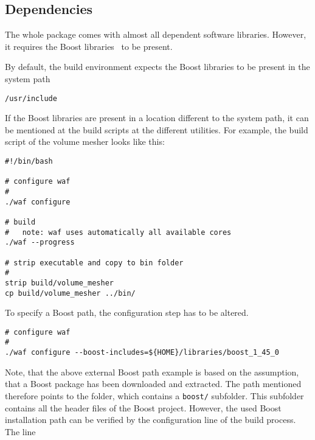 \subsection{Dependencies}
The whole package comes with almost all dependent software libraries.
However, it requires the Boost libraries~\cite{boost} to be present.


By default, the build environment expects the Boost libraries to be present 
in the system path
\begin{exaipd}
\begin{Verbatim}
/usr/include
\end{Verbatim}
\end{exaipd}

\clearpage

If the Boost libraries are present in a location different to the system 
path, it can be mentioned at the build scripts at the different 
utilities. For example, the build script of the volume mesher looks like this:

\begin{exaipd}
\begin{Verbatim}
#!/bin/bash

# configure waf
#
./waf configure 

# build
#   note: waf uses automatically all available cores
./waf --progress

# strip executable and copy to bin folder
#
strip build/volume_mesher
cp build/volume_mesher ../bin/
\end{Verbatim}
\end{exaipd}

To specify a Boost path, the configuration step has to be altered.

\begin{exaipd}
\begin{Verbatim}
# configure waf
#
./waf configure --boost-includes=${HOME}/libraries/boost_1_45_0
\end{Verbatim}
\end{exaipd}

Note, that the above external Boost path example is based on the assumption, 
that a Boost package has been downloaded and extracted. The path mentioned 
therefore points to the folder, which contains a \texttt{boost/} subfolder.
This subfolder contains all the header files of the Boost project.
However, the used Boost installation path can be verified by the configuration 
line of the build process. The line

